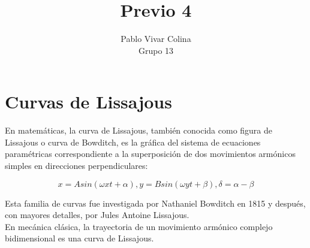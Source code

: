 \documentclass{article}
\title{Previo 4}
\author{Pablo Vivar Colina\\
Grupo 13\\
}
\begin{document}
\maketitle

\section{Curvas de Lissajous}

En matemáticas, la curva de Lissajous, también conocida como figura de Lissajous o curva de Bowditch, es la gráfica del sistema de ecuaciones paramétricas correspondiente a la superposición de dos movimientos armónicos simples en direcciones perpendiculares:\citep{CurvasLiss}

\begin{equation}
    x = A sin ⁡ (ω x t + \alpha ) , y = B sin ⁡ ( ω y t + β ) , δ = \alpha  − β 
\end{equation}

    

Esta familia de curvas fue investigada por Nathaniel Bowditch en 1815 y después, con mayores detalles, por Jules Antoine Lissajous.\citep{CurvasLiss}\\

En mecánica clásica, la trayectoria de un movimiento armónico complejo bidimensional es una curva de Lissajous.\citep{CurvasLiss}
\end{document}
